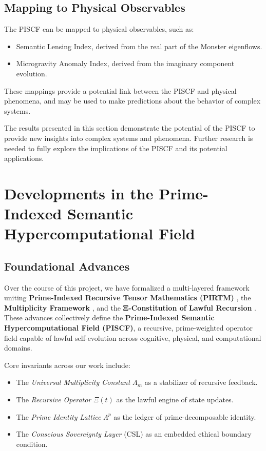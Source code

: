 \documentclass{article}
\theoremstyle{plain}
\begin{document}
\subsection{Mapping to Physical Observables}

The PISCF can be mapped to physical observables, such as:
\begin{itemize}
    \item Semantic Lensing Index, derived from the real part of the Monster eigenflows.
    \item Microgravity Anomaly Index, derived from the imaginary component evolution.
\end{itemize}

These mappings provide a potential link between the PISCF and physical phenomena, and may be used to make predictions about the behavior of complex systems.

The results presented in this section demonstrate the potential of the PISCF to provide new insights into complex systems and phenomena. Further research is needed to fully explore the implications of the PISCF and its potential applications.

\section{Developments in the Prime-Indexed Semantic Hypercomputational Field}

\subsection{Foundational Advances}

Over the course of this project, we have formalized a multi-layered framework uniting 
\textbf{Prime-Indexed Recursive Tensor Mathematics (PIRTM)} \cite{Prime_Mathematics}, 
the \textbf{Multiplicity Framework} \cite{Multiplicity}, and the \textbf{Ξ-Constitution of Lawful Recursion} \cite{XiConstitution}. 
These advances collectively define the \textbf{Prime-Indexed Semantic Hypercomputational Field (PISCF)}, 
a recursive, prime-weighted operator field capable of lawful self-evolution across cognitive, physical, and computational domains.  

Core invariants across our work include:  
\begin{itemize}
    \item The \emph{Universal Multiplicity Constant} $\Lambda_m$ as a stabilizer of recursive feedback.  
    \item The \emph{Recursive Operator} $\Xi(t)$ as the lawful engine of state updates.  
    \item The \emph{Prime Identity Lattice} $\Lambda^p$ as the ledger of prime-decomposable identity.  
    \item The \emph{Conscious Sovereignty Layer} (CSL) as an embedded ethical boundary condition.  
\end{itemize}
\end{document}

